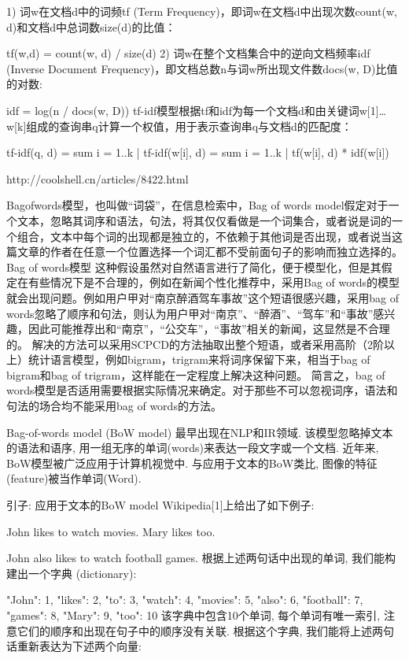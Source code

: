 \documentclass[10pt,a4paper]{ctexbook}
\begin{document}
1) 词w在文档d中的词频tf (Term Frequency)，即词w在文档d中出现次数count(w, d)和文档d中总词数size(d)的比值：

tf(w,d) = count(w, d) / size(d) 
2) 词w在整个文档集合中的逆向文档频率idf (Inverse Document Frequency)，即文档总数n与词w所出现文件数docs(w, D)比值的对数:

idf = log(n / docs(w, D)) 
tf-idf模型根据tf和idf为每一个文档d和由关键词w[1]…w[k]组成的查询串q计算一个权值，用于表示查询串q与文档d的匹配度：

tf-idf(q, d) 
= sum { i = 1..k | tf-idf(w[i], d) } 
= sum { i = 1..k | tf(w[i], d) * idf(w[i]) } 
 

http://coolshell.cn/articles/8422.html



Bagofwords模型，也叫做“词袋”，在信息检索中，Bag of words model假定对于一个文本，忽略其词序和语法，句法，将其仅仅看做是一个词集合，或者说是词的一个组合，文本中每个词的出现都是独立的，不依赖于其他词是否出现，或者说当这篇文章的作者在任意一个位置选择一个词汇都不受前面句子的影响而独立选择的。
Bag of words模型
这种假设虽然对自然语言进行了简化，便于模型化，但是其假定在有些情况下是不合理的，例如在新闻个性化推荐中，采用Bag of words的模型就会出现问题。例如用户甲对“南京醉酒驾车事故”这个短语很感兴趣，采用bag of words忽略了顺序和句法，则认为用户甲对“南京”、“醉酒”、“驾车”和“事故”感兴趣，因此可能推荐出和“南京”，“公交车”，“事故”相关的新闻，这显然是不合理的。
解决的方法可以采用SCPCD的方法抽取出整个短语，或者采用高阶（2阶以上）统计语言模型，例如bigram，trigram来将词序保留下来，相当于bag of bigram和bag of trigram，这样能在一定程度上解决这种问题。
简言之，bag of words模型是否适用需要根据实际情况来确定。对于那些不可以忽视词序，语法和句法的场合均不能采用bag of words的方法。




Bag-of-words model (BoW model) 最早出现在NLP和IR领域. 该模型忽略掉文本的语法和语序, 用一组无序的单词(words)来表达一段文字或一个文档. 近年来, BoW模型被广泛应用于计算机视觉中. 与应用于文本的BoW类比, 图像的特征(feature)被当作单词(Word).

引子: 应用于文本的BoW model
Wikipedia[1]上给出了如下例子:

   John likes to watch movies. Mary likes too.

      John also likes to watch football games.
      根据上述两句话中出现的单词, 我们能构建出一个字典 (dictionary):

      {"John": 1, "likes": 2, "to": 3, "watch": 4, "movies": 5, "also": 6, "football": 7, "games": 8, "Mary": 9, "too": 10}
      该字典中包含10个单词, 每个单词有唯一索引, 注意它们的顺序和出现在句子中的顺序没有关联. 根据这个字典, 我们能将上述两句话重新表达为下述两个向量:
\end{document}
